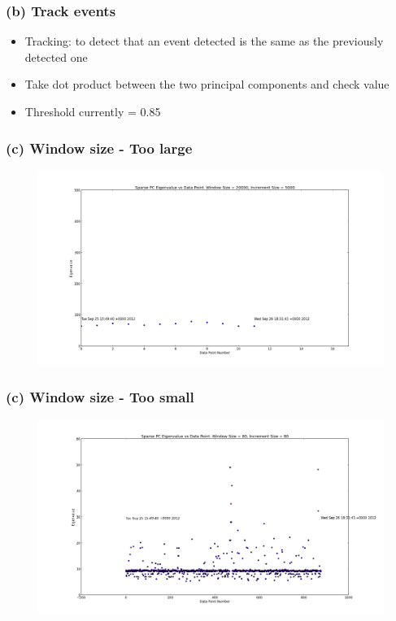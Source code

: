 \documentclass{beamer}
\begin{document}
\begin{frame}
\frametitle{(b) Track events}
\begin{itemize}
\item Tracking: to detect that an event detected is the same as the previously detected one
\item Take dot product between the two principal components and check value
\item Threshold currently = 0.85
\end{itemize}
\end{frame}

\begin{frame}[h]
\frametitle{(c) Window size - Too large}

\begin{figure}

\includegraphics[scale=0.2]{Testing_Streaming_App_20000_5000.png}

\end{figure}
\end{frame}

\begin{frame}

\frametitle{(c) Window size - Too small}

\begin{figure}[h]

\includegraphics[scale=0.2]{Testing_Streaming_App_80_80.png}

\end{figure}

\end{frame}
\end{document}
